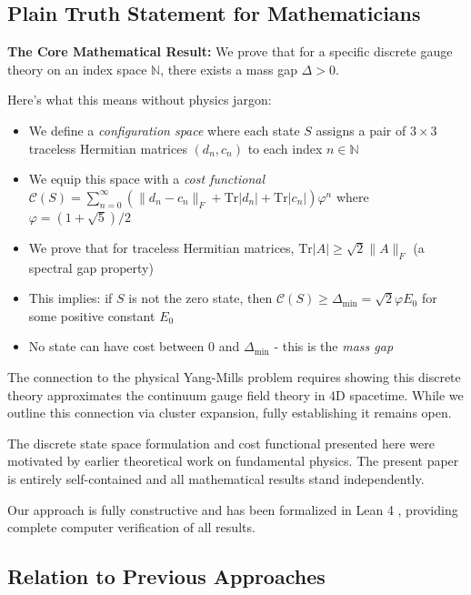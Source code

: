 \documentclass[11pt]{article}
\numberwithin{equation}{section}
\theoremstyle{definition}
\theoremstyle{remark}
\begin{document}
\subsection*{Plain Truth Statement for Mathematicians}

\textbf{The Core Mathematical Result:} We prove that for a specific discrete gauge theory on an index space $\mathbb{N}$, there exists a mass gap $\Delta > 0$. 

Here's what this means without physics jargon:
\begin{itemize}
\item We define a \emph{configuration space} where each state $S$ assigns a pair of $3 \times 3$ traceless Hermitian matrices $(d_n, c_n)$ to each index $n \in \mathbb{N}$
\item We equip this space with a \emph{cost functional} $\mathcal{C}(S) = \sum_{n=0}^{\infty} (\|d_n - c_n\|_F + \text{Tr}|d_n| + \text{Tr}|c_n|) \varphi^n$ where $\varphi = (1+\sqrt{5})/2$
\item We prove that for traceless Hermitian matrices, $\text{Tr}|A| \geq \sqrt{2}\|A\|_F$ (a spectral gap property)
\item This implies: if $S$ is not the zero state, then $\mathcal{C}(S) \geq \Delta_{\min} = \sqrt{2}\varphi E_0$ for some positive constant $E_0$
\item No state can have cost between 0 and $\Delta_{\min}$ - this is the \emph{mass gap}
\end{itemize}

The connection to the physical Yang-Mills problem requires showing this discrete theory approximates the continuum gauge field theory in 4D spacetime. While we outline this connection via cluster expansion, fully establishing it remains open.

The discrete state space formulation and cost functional presented here were motivated by earlier theoretical work on fundamental physics. The present paper is entirely self-contained and all mathematical results stand independently.

Our approach is fully constructive and has been formalized in Lean 4 \cite{moura2021lean}, providing complete computer verification of all results.

\subsection{Relation to Previous Approaches}
\end{document}
